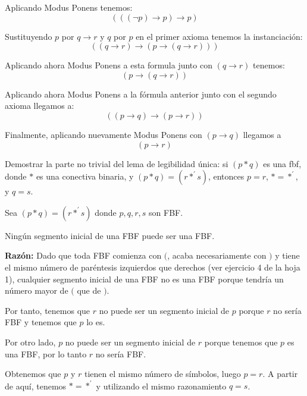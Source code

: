 \begin{problem}[1]
Aplicando Modus Ponens tenemos:
\[ ( ((\neg p) \to p) \to p)\]

\spart
Sustituyendo $p$ por $q \to r$ y $q$ por $p$ en el primer axioma tenemos la instanciación:
\[((q \to r) \to (p \to (q \to r)))\]

Aplicando ahora Modus Ponens a esta formula junto con $(q \to r)$ tenemos:
\[(p \to (q \to r))\]

Aplicando ahora Modus Ponens a la fórmula anterior junto con el segundo axioma llegamos a:
\[ ( (p\to q) \to (p\to r))\]

Finalmente, aplicando nuevamente Modus Ponens con $(p \to q)$ llegamos a
\[(p \to r )\]
\end{problem}

\begin{problem}[2]
Demostrar la parte no trivial del lema de legibilidad \'unica: si $(p * q)$ es una fbf, donde $*$ es una conectiva
binaria, y $(p * q) = (r *^\prime s)$, entonces $p = r$,  $*  = *^\prime$, y $q = s$.
\solution
{}

Sea $(p \ast q) = (r\ast^\prime s)$ donde $p,q,r,s$ son FBF.

Ningún segmento inicial de una FBF puede ser una FBF.

\textbf{Razón: } Dado que toda FBF comienza con $($, acaba necesariamente con $)$ y tiene el mismo número de paréntesis izquierdos que derechos (ver ejercicio 4 de la hoja 1), cualquier segmento inicial de una FBF no es una FBF porque tendría un número mayor de $($ que de $)$.

Por tanto, tenemos que $r$ no puede ser un segmento inicial de $p$ porque $r$ no sería FBF y tenemos que $p$ lo es.

Por otro lado, $p$ no puede ser un segmento inicial de $r$ porque tenemos que $p$ es una FBF, por lo tanto $r$ no sería FBF.

Obtenemos que $p$ y $r$ tienen el mismo número de símbolos, luego $p=r$. A partir de aquí, tenemos $\ast = \ast^\prime$ y utilizando el mismo razonamiento $q=s$.

\end{problem}


